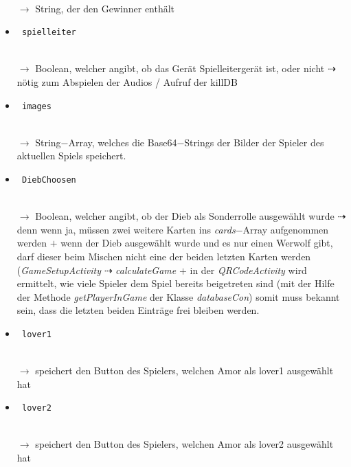 \documentclass[12pt, a4paper]{article}
\begin{document}
\begin{itemize}
\begin{verbatim}
\end{verbatim} \\
\vspace{-0.2 cm}
$\rightarrow$ String, der den Gewinner enthält
\item \begin{verbatim} spielleiter
\end{verbatim} \\
\vspace{-0.2 cm}
$\rightarrow$ Boolean, welcher angibt, ob das Gerät Spielleitergerät ist, oder nicht $\dashrightarrow$ nötig zum Abspielen der Audios / Aufruf der killDB
\item \begin{verbatim} images
\end{verbatim} \\
\vspace{-0.2 cm}
$\rightarrow$ String$-$Array, welches die Base64$-$Strings der Bilder der Spieler des aktuellen Spiels speichert.
\item \begin{verbatim} DiebChoosen
\end{verbatim} \\
\vspace{-0.2 cm}
$\rightarrow$ Boolean, welcher angibt, ob der Dieb als Sonderrolle ausgewählt wurde $\dashrightarrow$ denn wenn ja, müssen zwei weitere Karten ins \textit{cards}$-$Array aufgenommen werden $+$ wenn der Dieb ausgewählt wurde und es nur einen Werwolf gibt, darf dieser beim Mischen nicht eine der beiden letzten Karten werden (\textit{GameSetupActivity} $\dashrightarrow$ \textit{calculateGame} $+$ in der \textit{QRCodeActivity} wird ermittelt, wie viele Spieler dem Spiel bereits beigetreten sind (mit der Hilfe der Methode \textit{getPlayerInGame} der Klasse \textit{databaseCon}) somit muss bekannt sein, dass die letzten beiden Einträge frei bleiben werden.
\item \begin{verbatim} lover1
\end{verbatim} \\
\vspace{-0.2 cm}
$\rightarrow$ speichert den Button des Spielers, welchen Amor als lover1 ausgewählt hat
\item \begin{verbatim} lover2
\end{verbatim} \\
\vspace{-0.2 cm}
$\rightarrow$ speichert den Button des Spielers, welchen Amor als lover2 ausgewählt hat 

\end{itemize}
\end{document}
